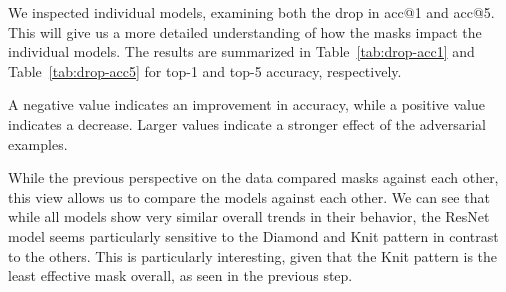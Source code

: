\documentclass[a4paper, oneside]{discothesis}
\begin{document}
We inspected individual models, examining both the drop in acc@1 and acc@5. This will give us a more detailed understanding of how the masks impact the individual models. The results are summarized in Table~\ref{tab:drop-acc1} and Table~\ref{tab:drop-acc5} for top-1 and top-5 accuracy, respectively.

A negative value indicates an improvement in accuracy, while a positive value indicates a decrease. Larger values indicate a stronger effect of the adversarial examples.

While the previous perspective on the data compared masks against each other, this view allows us to compare the models against each other. We can see that while all models show very similar overall trends in their behavior, the ResNet model seems particularly sensitive to the Diamond and Knit pattern in contrast to the others. This is particularly interesting, given that the Knit pattern is the least effective mask overall, as seen in the previous step.
\end{document}
